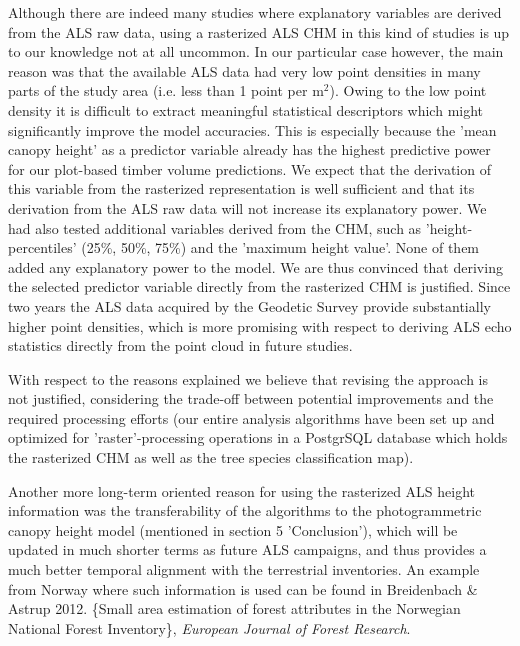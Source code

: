 \documentclass{article}
\begin{document}
\begin{enumerate}
{  Although there are indeed many studies where explanatory variables are derived from the ALS raw data, using a rasterized ALS CHM in this kind of studies is up to our knowledge not at all uncommon. In our particular case however, the main reason was that the available ALS data had very low point densities in many parts of the study area (i.e. less than 1 point per m$^2$). Owing to the low point density it is difficult to extract meaningful statistical descriptors which might significantly improve the model accuracies. This is especially because the 'mean canopy height' as a predictor variable already has the highest predictive power for our plot-based timber volume predictions. We expect that the derivation of this variable from the rasterized representation is well sufficient and that its derivation from the ALS raw data will not increase its explanatory power. We had also tested additional variables derived from the CHM, such as 'height-percentiles' (25\%, 50\%, 75\%) and the 'maximum height value'. None of them added any explanatory power to the model. We are thus convinced that deriving the selected predictor variable directly from the rasterized CHM is justified. Since two years the ALS data acquired by the Geodetic Survey provide substantially higher point densities, which is more promising with respect to deriving ALS echo statistics directly from the point cloud in future studies.
  	 	
  With respect to the reasons explained we believe that revising the approach is not justified, considering the trade-off between potential improvements and the required processing efforts (our entire analysis algorithms have been set up and optimized for 'raster'-processing  operations in a PostgrSQL database which holds the rasterized CHM as well as the tree species classification map).
  
  Another more long-term oriented reason for using the rasterized ALS height information was the transferability of the algorithms to the photogrammetric canopy height model (mentioned in section 5 'Conclusion'), which will be updated in much shorter terms as future ALS campaigns, and thus provides a much better temporal alignment with the terrestrial inventories. An example from Norway where such information is used can be found in Breidenbach \& Astrup 2012. \{Small area estimation of forest attributes in the Norwegian National Forest Inventory\}, \textit{European Journal of Forest Research}.
   	
  }



\end{enumerate}
\end{document}
